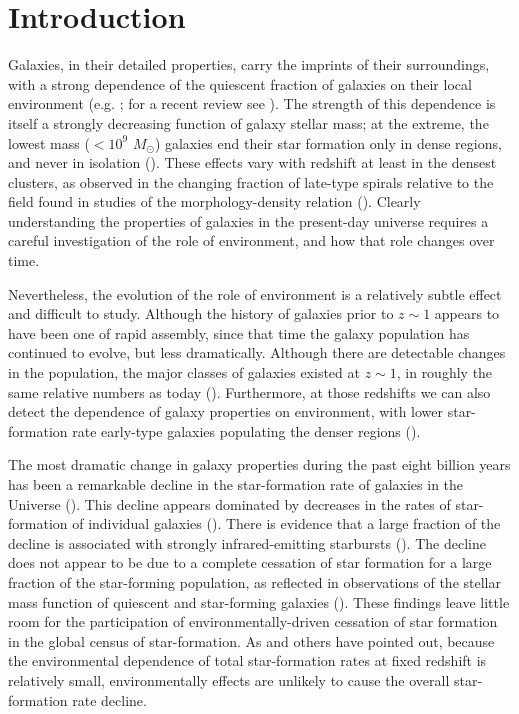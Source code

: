 \documentclass{emulateapj}
\begin{document}
\section{Introduction}
Galaxies, in their detailed properties, carry the imprints of their
surroundings, with a strong dependence of the quiescent fraction of
galaxies on their local environment (e.g. \citealt{hubble36,
oemler74a, dressler80a, hermit96a, guzzo97a}; for a recent review see
\citealt{blanton09a}).  The strength of this dependence is itself a
strongly decreasing function of galaxy stellar mass; at the extreme,
the lowest mass ($<10^{9}$ $M_\odot$) galaxies end their
star formation only in
dense regions, and never in isolation (\citealt{geha12a}).  These
effects vary with redshift at least in the densest clusters, as
observed in the changing fraction of late-type spirals relative to the
field found in studies of the morphology-density relation
(\citealt{dressler84a, desai07a}).  Clearly understanding the
properties of galaxies in the present-day universe requires a careful
investigation of the role of environment, and how that role changes
over time.

Nevertheless, the evolution of the role of environment is a relatively
subtle effect and difficult to study.  Although the history of galaxies
prior to $z\sim 1$ appears to have been one of rapid assembly, since
that time the galaxy population has continued to evolve, but less
dramatically. Although there are detectable changes in the population,
the major classes of galaxies existed at $z\sim 1$, in roughly the
same relative numbers as today (\citealt{bundy06a, borch06a,
taylor09a, Moustakas:2013aa}). Furthermore, at those redshifts we can also
detect the dependence of galaxy properties on environment, with lower
star-formation rate early-type galaxies populating the denser regions
(\citealt{cooper08a, patel09a, kovac10a}).

The most dramatic change in galaxy properties during the past eight
billion years has been a remarkable decline in the star-formation rate
of galaxies in the Universe (\citealt{hopkins06a}).  This decline
appears dominated by decreases in the rates of star-formation of
individual galaxies (\citealt{Noeske:2007aa}). There is evidence that
a large fraction of the decline is associated with strongly
infrared-emitting starbursts (\citealt{bell05a, magnelli09a}).  The
decline does not appear to be due to a complete cessation of star
formation for a large fraction of the star-forming population, as
reflected in observations of the stellar mass function of quiescent
and star-forming galaxies (\citealt{Blanton:2006aa, bundy06a,
  borch06a, Moustakas:2013aa}).  These findings leave little room for
the participation of environmentally-driven cessation of star
formation in the global census of star-formation.  As \cite{cooper08a}
and others have pointed out, because the environmental dependence of
total star-formation rates at fixed redshift is relatively small,
environmentally effects are unlikely to cause the overall
star-formation rate decline.
\end{document}
